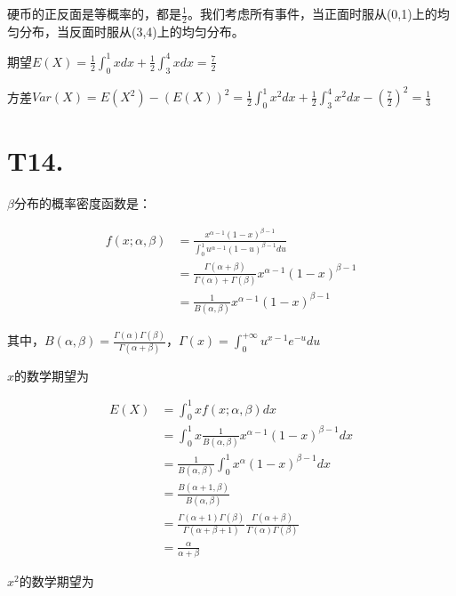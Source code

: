 \documentclass{article}
\newcommand\f[2]{\frac{#1}{#2}}
\begin{document}
硬币的正反面是等概率的，都是$\f{1}{2}$。我们考虑所有事件，当正面时服从(0,1)上的均匀分布，当反面时服从(3,4)上的均匀分布。

期望$E(X)=\f{1}{2}\int_{0}^{1}xdx+\f{1}{2}\int_{3}^{4}xdx=\f{7}{2}$

方差$Var(X)=E(X^2)-(E(X))^2=\f{1}{2}\int_{0}^{1}x^2dx+\f{1}{2}\int_{3}^{4}x^2dx-(\f{7}{2})^2=\f{1}{3}$

\section*{T14. }

$\beta$分布的概率密度函数是：

\begin{equation}
    \begin{aligned}
        f(x;\alpha,\beta)
        & = \f{x^{\alpha-1}(1-x)^{\beta-1}}{\int_{0}^{1}u^{\alpha-1}(1-u)^{\beta-1}du}\\
        & = \f{\Gamma(\alpha+\beta)}{\Gamma(\alpha)+\Gamma(\beta)}x^{\alpha-1}(1-x)^{\beta-1}\\
        & = \f{1}{B(\alpha,\beta)}x^{\alpha-1}(1-x)^{\beta-1}
    \end{aligned}
\end{equation}

其中，$B(\alpha,\beta)=\f{\Gamma(\alpha)\Gamma(\beta)}{\Gamma(\alpha+\beta)}$，$\Gamma(x)=\int_{0}^{+\infty}u^{x-1}e^{-u}du$

$x$的数学期望为

\begin{equation}
    \begin{aligned}
        E(X)
        & = \int_{0}^{1}xf(x;\alpha,\beta)dx\\
        & = \int_{0}^{1}x \f{1}{B(\alpha,\beta)}x^{\alpha-1}(1-x)^{\beta-1}dx\\
        & = \f{1}{B(\alpha,\beta)}\int_{0}^{1}x^{\alpha}(1-x)^{\beta-1}dx\\
        & = \f{B(\alpha+1,\beta)}{B(\alpha,\beta)}\\
        & = \f{\Gamma(\alpha+1)\Gamma(\beta)}{\Gamma(\alpha+\beta+1)}\f{\Gamma(\alpha+\beta)}{\Gamma(\alpha)\Gamma(\beta)}\\
        & = \f{\alpha}{\alpha+\beta}
    \end{aligned}
\end{equation}

$x^2$的数学期望为
\end{document}
